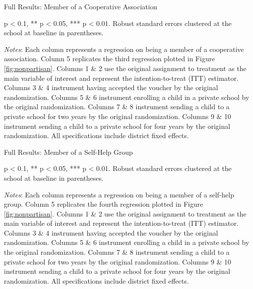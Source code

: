 \documentclass[hidelinks, 12pt, titlepage]{article}
\begin{document}
\begin{landscape}
					\clearpage

					\begin{table}
						\begin{threeparttable}
							\centering
							\caption{Full Results: Member of a Cooperative Association\label{table:appendixcoops}}
							
							\begin{tablenotes}
								\item * p < 0.1, ** p < 0.05, *** p < 0.01. Robust standard errors clustered at the school at baseline in parentheses.
								\item \emph{Notes}: Each column represents a regression on being a member of a cooperative association.  Column 5 replicates the third regression plotted in Figure \ref{fig:nonpartisan}.  Columns 1 \& 2 use the original assignment to treatment as the main variable of interest and represent the intention-to-treat (ITT) estimator.  Columns 3 \& 4 instrument having accepted the voucher by the original randomization.  Columns 5 \& 6 instrument enrolling a child in a private school by the original randomization.  Columns 7 \& 8 instrument sending a child to a private school for two years by the original randomization.  Columns 9 \& 10 instrument sending a child to a private school for four years by the original randomization.  All specifications include district fixed effects.
							\end{tablenotes}
						\end{threeparttable}
					\end{table}

					\clearpage

					\begin{table}
						\begin{threeparttable}
							\centering
							\caption{Full Results: Member of a Self-Help Group\label{table:appendixshg}}
							
							\begin{tablenotes}
								\item * p < 0.1, ** p < 0.05, *** p < 0.01. Robust standard errors clustered at the school at baseline in parentheses.
								\item \emph{Notes}: Each column represents a regression on being a member of a self-help group.  Column 5 replicates the fourth regression plotted in Figure \ref{fig:nonpartisan}.  Columns 1 \& 2 use the original assignment to treatment as the main variable of interest and represent the intention-to-treat (ITT) estimator.  Columns 3 \& 4 instrument having accepted the voucher by the original randomization.  Columns 5 \& 6 instrument enrolling a child in a private school by the original randomization.  Columns 7 \& 8 instrument sending a child to a private school for two years by the original randomization.  Columns 9 \& 10 instrument sending a child to a private school for four years by the original randomization.  All specifications include district fixed effects.
							\end{tablenotes}
						\end{threeparttable}
					\end{table}


\end{landscape}
\end{document}
